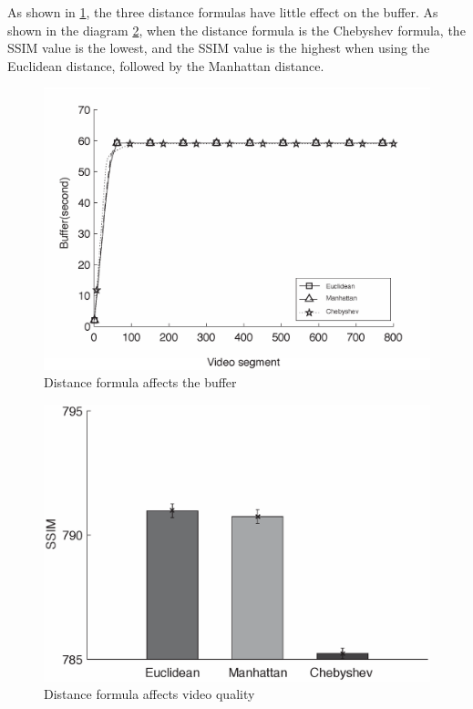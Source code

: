 \documentclass[twocolumn]{article}
\begin{document}
As shown in \ref{distance_buffer}, the three distance formulas have little effect 
on the buffer. As shown in the diagram \ref{distance_ssim}, when the distance formula
 is the Chebyshev formula, the SSIM value is the lowest, and the SSIM value is 
 the highest when using the Euclidean distance, followed by the Manhattan distance.
\begin{figure}[htbp]
\centering
\includegraphics[width=\columnwidth]{distance_buffer}
\caption{Distance formula affects the buffer}
\label{distance_buffer}
\end{figure}
\begin{figure}[htbp]
\centering
\includegraphics[width=\columnwidth]{distance_ssim}
\caption{Distance formula affects video quality}
\label{distance_ssim}
\end{figure}
\end{document}

